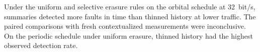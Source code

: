Under the uniform and selective erasure rules on the orbital schedule at 32~bit/s, summaries detected more faults in time than thinned history at lower traffic. The paired comparisons with fresh contextualized measurements were inconclusive. On the periodic schedule under uniform erasure, thinned history had the highest observed detection rate.
